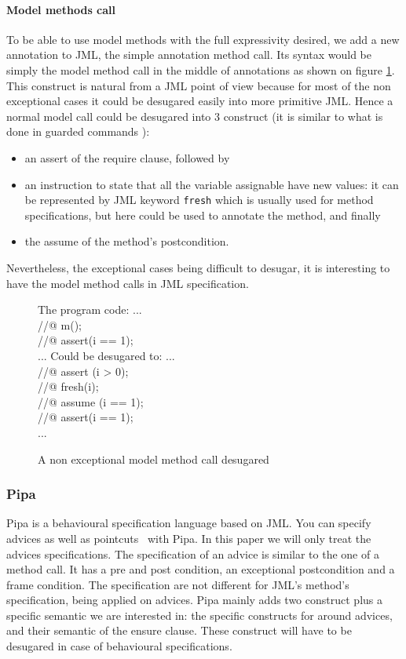 \paragraph{Model methods call}
To be able to use model methods with the full expressivity desired, we add a new annotation to JML, the simple 
annotation method call. Its syntax would be simply the model method call in the middle of annotations as shown 
on figure \ref{model_meth}. This construct is natural from a JML point of view because for most of the non 
exceptional cases  it could be desugared easily into 
more primitive JML. Hence a normal model call could be desugared into 3 construct (it is similar to what is done
in guarded commands \cite{BarnettL05}):
\begin{itemize} 
\item an assert of the require clause, followed by 
\item an  instruction to state that all the variable assignable have new values: it can be represented by JML 
keyword {\tt fresh} which is usually used for method specifications, but here could be used to annotate the method, 
and finally 
\item the assume of the method's postcondition.
\end{itemize}
Nevertheless, the exceptional cases being difficult to desugar, it is interesting to have the model method calls in
JML specification.

\begin{figure}
\begin{center}\begin{minipage}{4cm}
The program code:
\bcode
...\\
//@ m();\\
//@ assert(i == 1);\\
...
\ecode
Could be desugared to:
\bcode
...\\
//@ assert (i > 0);\\
//@ fresh(i);\\
//@ assume (i == 1);\\
//@ assert(i == 1);\\
...
\ecode
\end{minipage}\end{center}
\caption{A non exceptional model method call desugared}
\label{model_meth}
\end{figure}
\subsubsection{Pipa}
Pipa is a behavioural specification language based on JML. 
You can specify advices as well as pointcuts~\cite{pointcuts07} with Pipa.
In this paper we will only treat the advices specifications. 
The specification of an advice is similar to the one of a method call. It has a pre and post condition,
an exceptional postcondition and a frame condition. The specification are not different for JML's method's 
specification, being applied on advices.
Pipa mainly adds two construct plus a specific semantic we are interested in:
the specific constructs for around advices, and their semantic of the ensure clause. These construct will have
to be desugared in case of behavioural specifications.



